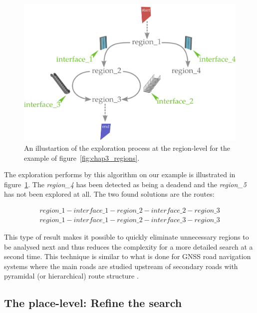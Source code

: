\begin{figure}[ht!]
\centering
\includegraphics[scale=0.12]{figures/chapter3/Region_exploration_graph.png}
\caption{\label{fig:chap3_region_expl} An illustartion of the exploration process at the region-level for the example of figure~\ref{fig:chap3_regions}.}
\end{figure}

The exploration performs by this algorithm on our example is illustrated in figure~\ref{fig:chap3_region_expl}. The \textit{region\_4} has been detected as being a deadend and the \textit{region\_5} has not been explored at all. The two found solutions are the routes:

\begin{align*}
region\_1 - interface\_1 - region\_2 - interface\_2 - region\_3 \\
region\_1 - interface\_1 - region\_2 - interface\_3 - region\_3
\end{align*}

This type of result makes it possible to quickly eliminate unnecessary regions to be analysed next and thus reduces the complexity for a more detailed search at a second time. This technique is similar to what is done for GNSS road navigation systems where the main roads are studied upstream of secondary roads with pyramidal (or hierarchical) route structure \cite{bovy_2012_route}.

\subsection{The place-level: Refine the search}

